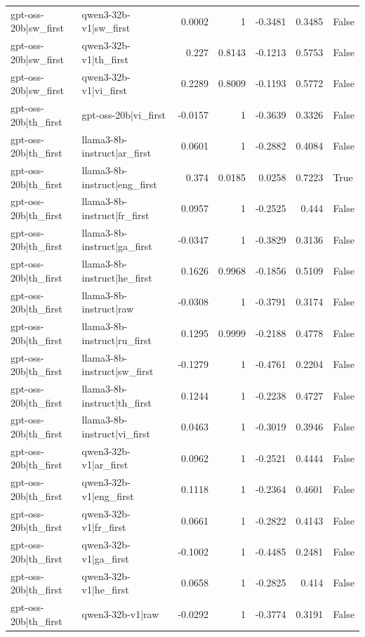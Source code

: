 \begin{table}
\begin{tabular}{l l r r r r l}
gpt-oss-20b|sw_first & qwen3-32b-v1|sw_first & 0.0002 & 1 & -0.3481 & 0.3485 & False \\
gpt-oss-20b|sw_first & qwen3-32b-v1|th_first & 0.227 & 0.8143 & -0.1213 & 0.5753 & False \\
gpt-oss-20b|sw_first & qwen3-32b-v1|vi_first & 0.2289 & 0.8009 & -0.1193 & 0.5772 & False \\
gpt-oss-20b|th_first & gpt-oss-20b|vi_first & -0.0157 & 1 & -0.3639 & 0.3326 & False \\
gpt-oss-20b|th_first & llama3-8b-instruct|ar_first & 0.0601 & 1 & -0.2882 & 0.4084 & False \\
gpt-oss-20b|th_first & llama3-8b-instruct|eng_first & 0.374 & 0.0185 & 0.0258 & 0.7223 & True \\
gpt-oss-20b|th_first & llama3-8b-instruct|fr_first & 0.0957 & 1 & -0.2525 & 0.444 & False \\
gpt-oss-20b|th_first & llama3-8b-instruct|ga_first & -0.0347 & 1 & -0.3829 & 0.3136 & False \\
gpt-oss-20b|th_first & llama3-8b-instruct|he_first & 0.1626 & 0.9968 & -0.1856 & 0.5109 & False \\
gpt-oss-20b|th_first & llama3-8b-instruct|raw & -0.0308 & 1 & -0.3791 & 0.3174 & False \\
gpt-oss-20b|th_first & llama3-8b-instruct|ru_first & 0.1295 & 0.9999 & -0.2188 & 0.4778 & False \\
gpt-oss-20b|th_first & llama3-8b-instruct|sw_first & -0.1279 & 1 & -0.4761 & 0.2204 & False \\
gpt-oss-20b|th_first & llama3-8b-instruct|th_first & 0.1244 & 1 & -0.2238 & 0.4727 & False \\
gpt-oss-20b|th_first & llama3-8b-instruct|vi_first & 0.0463 & 1 & -0.3019 & 0.3946 & False \\
gpt-oss-20b|th_first & qwen3-32b-v1|ar_first & 0.0962 & 1 & -0.2521 & 0.4444 & False \\
gpt-oss-20b|th_first & qwen3-32b-v1|eng_first & 0.1118 & 1 & -0.2364 & 0.4601 & False \\
gpt-oss-20b|th_first & qwen3-32b-v1|fr_first & 0.0661 & 1 & -0.2822 & 0.4143 & False \\
gpt-oss-20b|th_first & qwen3-32b-v1|ga_first & -0.1002 & 1 & -0.4485 & 0.2481 & False \\
gpt-oss-20b|th_first & qwen3-32b-v1|he_first & 0.0658 & 1 & -0.2825 & 0.414 & False \\
gpt-oss-20b|th_first & qwen3-32b-v1|raw & -0.0292 & 1 & -0.3774 & 0.3191 & False \\

\end{tabular}
\end{table}
